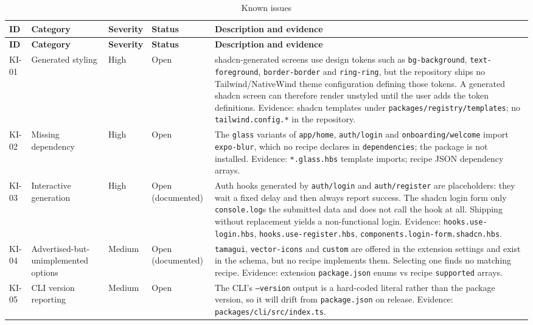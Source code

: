 \begin{longtable}{@{}L{1.2cm}L{3.3cm}L{1.6cm}L{1.1cm}L{6.4cm}@{}}
\caption{Known issues}\\
\toprule
\textbf{ID} & \textbf{Category} & \textbf{Severity} & \textbf{Status} &
\textbf{Description and evidence} \\
\midrule
\endfirsthead
\toprule
\textbf{ID} & \textbf{Category} & \textbf{Severity} & \textbf{Status} &
\textbf{Description and evidence} \\
\midrule
\endhead
KI-01 & Generated styling & High & Open & shadcn-generated screens use design tokens
such as \texttt{bg-background}, \texttt{text-foreground},
\texttt{border-border} and \texttt{ring-ring}, but the repository ships no
Tailwind/NativeWind theme configuration defining those tokens. A generated shadcn
screen can therefore render unstyled until the user adds the token definitions.
Evidence: shadcn templates under \texttt{packages/registry/templates}; no
\texttt{tailwind.config.*} in the repository. \\
KI-02 & Missing dependency & High & Open & The \texttt{glass} variants of
\texttt{app/home}, \texttt{auth/login} and \texttt{onboarding/welcome} import
\texttt{expo-blur}, which no recipe declares in \texttt{dependencies}; the package
is not installed. Evidence: \texttt{*.glass.hbs} template imports; recipe JSON
dependency arrays. \\
KI-03 & Interactive generation & High & Open (documented) & Auth hooks generated by
\texttt{auth/login} and \texttt{auth/register} are placeholders: they wait a fixed
delay and then always report success. The shadcn login form only
\texttt{console.log}s the submitted data and does not call the hook at all.
Shipping without replacement yields a non-functional login. Evidence:
\texttt{hooks.use-login.hbs}, \texttt{hooks.use-register.hbs},
\texttt{components.login-form.shadcn.hbs}. \\
KI-04 & Advertised-but-unimplemented options & Medium & Open (documented) &
\texttt{tamagui}, \texttt{vector-icons} and \texttt{custom} are offered in the
extension settings and exist in the schema, but no recipe implements them.
Selecting one finds no matching recipe. Evidence: extension
\texttt{package.json} enums vs recipe \texttt{supported} arrays. \\
KI-05 & CLI version reporting & Medium & Open & The CLI's \texttt{--version} output
is a hard-coded literal rather than the package version, so it will drift from
\texttt{package.json} on release. Evidence:
\texttt{packages/cli/src/index.ts}. \\

\end{longtable}
